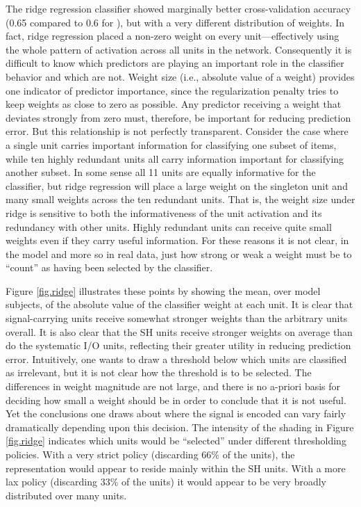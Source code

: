 The ridge regression classifier showed marginally better cross-validation accuracy (0.65 compared to 0.6 for {\lasso}), but with a very different distribution of weights. In fact, ridge regression placed a non-zero weight on every unit---effectively using the whole pattern of activation across all units in the network. Consequently it is difficult to know which predictors are playing an important role in the classifier behavior and which are not. Weight size (i.e., absolute value of a weight) provides one indicator of predictor importance, since the regularization penalty tries to keep weights as close to zero as possible. Any predictor receiving a weight that deviates strongly from zero must, therefore, be important for reducing prediction error. But this relationship is not perfectly transparent. Consider the case where a single unit carries important information for classifying one subset of items, while ten highly redundant units all carry information important for classifying another subset. In some sense all 11 units are equally informative for the classifier, but ridge regression will place a large weight on the singleton unit and many small weights across the ten redundant units. That is, the weight size under ridge is sensitive to both the informativeness of the unit activation and its redundancy with other units. Highly redundant units can receive quite small weights even if they carry useful information. For these reasons it is not clear, in the model and more so in real data, just how strong or weak a weight must be to ``count'' as having been selected by the classifier. 

Figure \ref{fig.ridge} illustrates these points by showing the mean, over model subjects, of the absolute value of the classifier weight at each unit. It is clear that signal-carrying units receive somewhat stronger weights than the arbitrary units overall. It is also clear that the SH units receive stronger weights on average than do the systematic I/O units, reflecting their greater utility in reducing prediction error. Intuitively, one wants to draw a threshold below which units are classified as irrelevant, but it is not clear how the threshold is to be selected. The differences in weight magnitude are not large, and there is no a-priori basis for deciding how small a weight should be in order to conclude that it is not useful. Yet the conclusions one draws about where the signal is encoded can vary fairly dramatically depending upon this decision. The intensity of the shading in Figure \ref{fig.ridge} indicates which units would be ``selected'' under different thresholding policies. With a very strict policy (discarding 66\% of the units), the representation would appear to reside mainly within the SH units. With a more lax policy (discarding 33\% of the units) it would appear to be very broadly distributed over many units.

